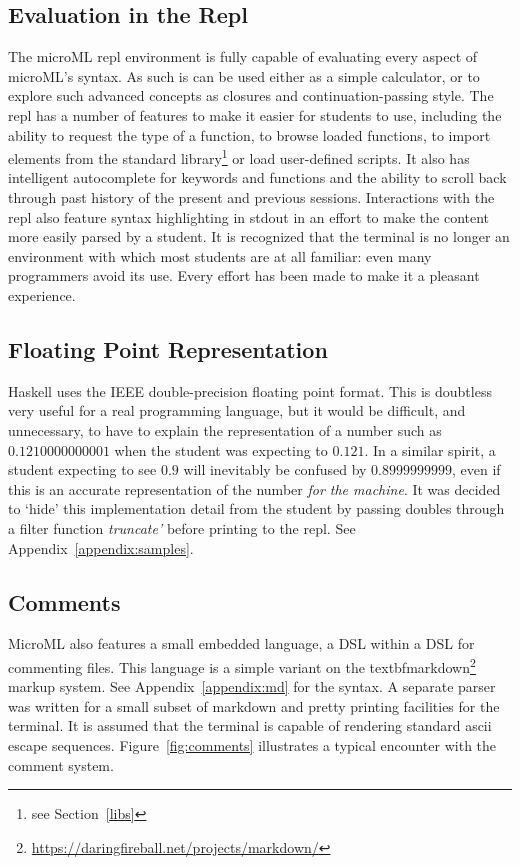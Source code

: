 \documentclass[12pt, a4paper]{report}
\begin{document}
\subsection{Evaluation in the Repl}
The microML repl environment is fully capable of evaluating every aspect of microML's syntax. As
such is can be used either as a simple calculator, or to explore such advanced concepts as closures
and continuation-passing style. The repl has a number of features to make it easier for students to
use, including the ability to request the type of a function, to browse loaded functions, to import
elements from the standard library\footnote{see Section~\ref{libs}} or load user-defined scripts.
It also has intelligent autocomplete for keywords and functions and the ability to scroll back
through past history of the present and previous sessions. Interactions with the repl also feature
syntax highlighting in stdout in an effort to make the content more easily parsed by a student. It
is recognized that the terminal is no longer an environment with which most students are at all
familiar: even many programmers avoid its use. Every effort has been made to make it a pleasant
experience.

\subsection{Floating Point Representation}
\label{floatingPoint}
Haskell uses the IEEE double-precision floating point format\cite{citeulike:4001400}.
This is doubtless very useful for a real programming language, but it would be difficult, and
unnecessary, to have to explain the representation of a number such as $0.1210000000001$ when the
student was expecting to $0.121$. In a similar spirit, a student expecting to see $0.9$ will
inevitably be confused by $0.8999999999$, even if this is an accurate representation of the number
\textit{for the machine}. It was decided to `hide' this implementation detail from the student by
passing doubles through a filter function \textit{truncate'} before printing to the repl. See
Appendix~\ref{appendix:samples}.

\subsection{Comments} MicroML also features a small embedded language, a DSL
within a DSL for commenting files. This language is a simple variant on the
textbf{markdown}\footnote{\url{https://daringfireball.net/projects/markdown/}} markup system. See
Appendix~\ref{appendix:md} for the syntax. A separate parser was written for a small subset of
markdown and pretty printing facilities for the terminal. It is assumed that the terminal is capable
of rendering standard ascii escape sequences. Figure~\ref{fig:comments} illustrates a typical
encounter with the comment system.
\end{document}

